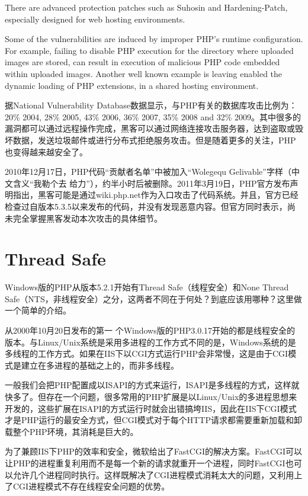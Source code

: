There are advanced protection patches such as Suhosin and Hardening-Patch, especially designed for web hosting environments.

Some of the vulnerabilities are induced by improper PHP's runtime configuration. For example, failing to disable PHP execution for the directory where uploaded images are stored, can result in execution of malicious PHP code embedded within uploaded images. Another well known example is leaving enabled the dynamic loading of PHP extensions, in a shared hosting environment.

据National Vulnerability Database数据显示，与PHP有关的数据库攻击比例为：20\% 2004, 28\% 2005, 43\% 2006, 36\% 2007, 35\% 2008 and 32\% 2009。其中很多的漏洞都可以通过远程操作完成，黑客可以通过网络连接攻击服务器，达到盗取或毁坏数据，发送垃圾邮件或进行分布式拒绝服务攻击。但是随着更多的关注，PHP也变得越来越安全了。


2010年12月17日，PHP代码“贡献者名单”中被加入“Wolegequ Gelivable”字样（中文含义“我勒个去 给力”），约半小时后被删除。2011年3月19日，PHP官方发布声明指出，黑客可能是通过wiki.php.net作为入口攻击了代码系统。并且，官方已经检查过自版本5.3.5以来发布的代码，并没有发现恶意内容。但官方同时表示，尚未完全掌握黑客发动本次攻击的具体细节。


\section{Thread Safe}

Windows版的PHP从版本5.2.1开始有Thread Safe（线程安全）和None Thread Safe（NTS，非线程安全）之分，这两者不同在于何处\cite{thread_safe}？到底应该用哪种？这里做一个简单的介绍。

从2000年10月20日发布的第一 个Windows版的PHP3.0.17开始的都是线程安全的版本。与Linux/Unix系统是采用多进程的工作方式不同的是，Windows系统的是多线程的工作方式。如果在IIS下以CGI方式运行PHP会非常慢，这是由于CGI模式是建立在多进程的基础之上的，而非多线程。

一般我们会把PHP配置成以ISAPI的方式来运行，ISAPI是多线程的方式，这样就快多了。但存在一个问题，很多常用的PHP扩展是以Linux/Unix的多进程思想来开发的，这些扩展在ISAPI的方式运行时就会出错搞垮IIS，因此在IIS下CGI模式才是PHP运行的最安全方式，但CGI模式对于每个HTTP请求都需要重新加载和卸载整个PHP环境，其消耗是巨大的。

为了兼顾IIS下PHP的效率和安全，微软给出了FastCGI的解决方案。FastCGI可以让PHP的进程重复利用而不是每一个新的请求就重开一个进程，同时FastCGI也可以允许几个进程同时执行。这样既解决了CGI进程模式消耗太大的问题，又利用上了CGI进程模式不存在线程安全问题的优势。

